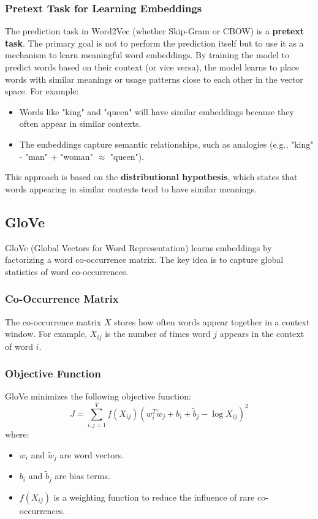 \begin{notechapter}
\subsubsection{Pretext Task for Learning Embeddings}
The prediction task in Word2Vec (whether Skip-Gram or CBOW) is a
\textbf{pretext task}. The primary goal is not to perform the
prediction itself but to use it as a mechanism to learn meaningful
word embeddings. By training the model to predict words based on
their context (or vice versa), the model learns to place words with
similar meanings or usage patterns close to each other in the vector space. For example:
\begin{itemize}
    \item Words like "king" and "queen" will have similar embeddings
    because they often appear in similar contexts.
    \item The embeddings capture semantic relationships, such as
    analogies (e.g., "king" - "man" + "woman" $\approx$ "queen"). 
\end{itemize}
This approach is based on the \textbf{distributional hypothesis}, which
states that words appearing in similar contexts tend to have similar
meanings.

\subsection{GloVe}
GloVe (Global Vectors for Word Representation) learns embeddings 
by factorizing a word co-occurrence matrix. The key idea is to 
capture global statistics of word co-occurrences.

\subsubsection{Co-Occurrence Matrix}
The co-occurrence matrix \( X \) stores how often words appear 
together in a context window. For example, \( X_{ij} \) is the 
number of times word \( j \) appears in the context of word \( i \).

\subsubsection{Objective Function}
GloVe minimizes the following objective function:
\[
J = \sum_{i,j=1}^V f(X_{ij}) (w_i^T \tilde{w}_j + b_i + \tilde{b}_j - \log X_{ij})^2
\]
where:
\begin{itemize}
    \item \( w_i \) and \( \tilde{w}_j \) are word vectors.
    \item \( b_i \) and \( \tilde{b}_j \) are bias terms.
    \item \( f(X_{ij}) \) is a weighting function to reduce the 
    influence of rare co-occurrences.
\end{itemize}


\end{notechapter}
